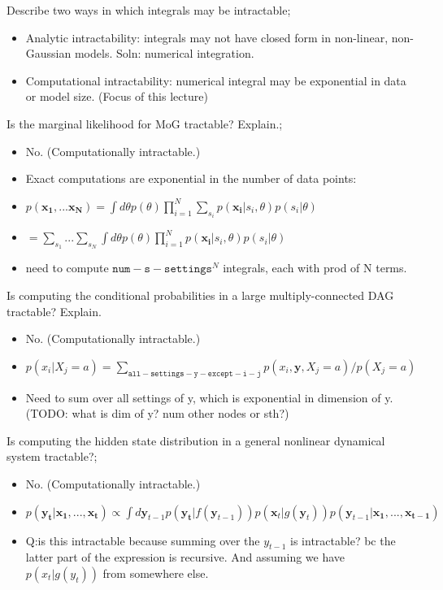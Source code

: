 \documentclass{article}
\begin{document}

Describe two ways in which integrals may be intractable; \begin{itemize}
	\item Analytic intractability: integrals may not have closed form in non-linear, non-Gaussian models. Soln: numerical integration.
	\item Computational intractability: numerical integral may be exponential in data or model size. (Focus of this lecture)
\end{itemize}

Is the marginal likelihood for MoG tractable? Explain.; \begin{itemize}
	\item No. (Computationally intractable.)
	\item Exact computations are exponential in the number of data points:
	\item $p(\bm{x_1, ... x_N}) = \int d\theta p(\theta)\prod_{i=1}^N\sum_{s_i}p(\bm{x_i}|s_i,\theta)p(s_i|\theta)$
	\item $= \sum_{s_1}...\sum_{s_N}\int d\theta p(\theta)\prod_{i=1}^Np(\bm{x_i}|s_i,\theta)p(s_i|\theta)$
	\item need to compute $\mathtt{num-s-settings}^N$ integrals, each with prod of N terms.
\end{itemize}

Is computing the conditional probabilities in a large multiply-connected DAG tractable? Explain. \begin{itemize}
	\item No. (Computationally intractable.)
	\item $p(x_i|X_j=a)=\sum_{\mathtt{all-settings-y-except-i-j}}p(x_i, \bm{y}, X_j=a)/p(X_j=a)$
	\item Need to sum over all settings of y, which is exponential in dimension of y. (TODO: what is dim of y? num other nodes or sth?)
\end{itemize}

Is computing the hidden state distribution in a general nonlinear dynamical system tractable?; \begin{itemize}
	\item No. (Computationally intractable.)
	\item $p(\bm{y_t|x_1, ..., x_t})\propto \int d\bm{y}_{t-1}p(\bm{y_t}|f(\bm{y}_{t-1}))p(\bm{x}_t|g(\bm{y}_t))p(\bm{y}_{t-1}|\bm{x_1,...,x_{t-1}})$
	\item Q:is this intractable because summing over the $y_{t-1}$ is intractable? bc the latter part of the expression is recursive. And assuming we have $p(x_t|g(y_t))$ from somewhere else.
\end{itemize}
\end{document}
